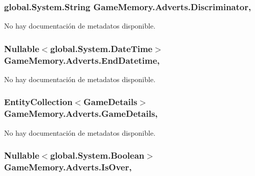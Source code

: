 \hypertarget{class_game_memory_1_1_adverts_ad72413d0b9d943aadea17ebcb8b522ff}{
\subsubsection[{Discriminator}]{\setlength{\rightskip}{0pt plus 5cm}global.\-System.\-String Game\-Memory.\-Adverts.\-Discriminator\hspace{0.3cm}{\ttfamily [get]}, {\ttfamily [set]}}}\label{class_game_memory_1_1_adverts_ad72413d0b9d943aadea17ebcb8b522ff}


No hay documentación de metadatos disponible. 

\hypertarget{class_game_memory_1_1_adverts_a21ad5dcffdf8c9b233901c6b55197e48}{
\subsubsection[{End\-Datetime}]{\setlength{\rightskip}{0pt plus 5cm}Nullable$<$global.\-System.\-Date\-Time$>$ Game\-Memory.\-Adverts.\-End\-Datetime\hspace{0.3cm}{\ttfamily [get]}, {\ttfamily [set]}}}\label{class_game_memory_1_1_adverts_a21ad5dcffdf8c9b233901c6b55197e48}


No hay documentación de metadatos disponible. 

\hypertarget{class_game_memory_1_1_adverts_a5d5125df7fe34a0738042333e9ec5dc6}{
\subsubsection[{Game\-Details}]{\setlength{\rightskip}{0pt plus 5cm}Entity\-Collection$<${\bf Game\-Details}$>$ Game\-Memory.\-Adverts.\-Game\-Details\hspace{0.3cm}{\ttfamily [get]}, {\ttfamily [set]}}}\label{class_game_memory_1_1_adverts_a5d5125df7fe34a0738042333e9ec5dc6}


No hay documentación de metadatos disponible. 

\hypertarget{class_game_memory_1_1_adverts_aef114b2666c933d5bba90f6a5def6e29}{
\subsubsection[{Is\-Over}]{\setlength{\rightskip}{0pt plus 5cm}Nullable$<$global.\-System.\-Boolean$>$ Game\-Memory.\-Adverts.\-Is\-Over\hspace{0.3cm}{\ttfamily [get]}, {\ttfamily [set]}}}\label{class_game_memory_1_1_adverts_aef114b2666c933d5bba90f6a5def6e29}


